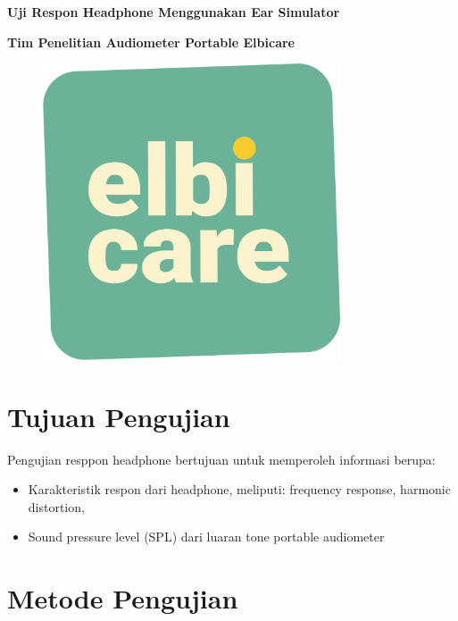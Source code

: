 \documentclass{article}
\begin{document}
	\begin{titlepage}
		\centering

		{
			\LARGE
			\bf
			Uji Respon Headphone Menggunakan Ear Simulator
		}

		\bigskip

		{
			\large
			\bf
			Tim Penelitian Audiometer Portable Elbicare
		}

		\vfill

		\begin{figure}[H]
			\centering
			\includegraphics[width=250pt,angle=0]{images/elbicare-logo}
		\end{figure}

		\vfill
	\end{titlepage}

	\newpage


	\section{Tujuan Pengujian}
	Pengujian resppon headphone bertujuan untuk memperoleh informasi berupa:
	\begin{itemize}
		\item Karakteristik respon dari headphone, meliputi: frequency response, harmonic distortion,
		\item Sound pressure level (SPL) dari luaran tone portable audiometer
	\end{itemize}

	\section{Metode Pengujian}
\end{document}
